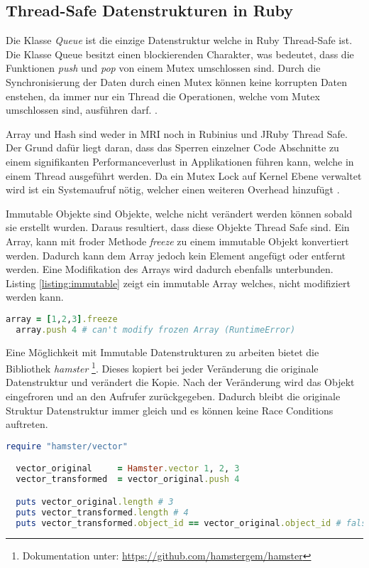 \subsection{Thread-Safe Datenstrukturen in Ruby}
Die Klasse \emph{Queue} ist die einzige Datenstruktur welche in Ruby Thread-Safe ist. Die Klasse Queue besitzt einen blockierenden Charakter, was bedeutet, dass die Funktionen \emph{push} und \emph{pop} von einem Mutex umschlossen sind. Durch die Synchronisierung der Daten durch einen Mutex können keine korrupten Daten enstehen, da immer nur ein Thread die Operationen, welche vom Mutex umschlossen sind, ausführen darf. \cite[p. 110]{Sto2013}. 

Array und Hash sind weder in MRI noch in Rubinius und JRuby Thread Safe. Der Grund dafür liegt daran, dass das Sperren einzelner Code Abschnitte zu einem signifikanten Performanceverlust in Applikationen führen kann, welche in einem Thread ausgeführt werden. Da ein Mutex Lock auf Kernel Ebene verwaltet wird ist ein Systemaufruf nötig, welcher einen weiteren Overhead hinzufügt \cite[p. 110]{Sto2013}.

Immutable Objekte sind Objekte, welche nicht verändert werden können sobald sie erstellt wurden. Daraus resultiert, dass diese Objekte Thread Safe sind. Ein Array, kann mit froder Methode \emph{freeze} zu einem immutable Objekt konvertiert werden. Dadurch kann dem Array jedoch kein Element angefügt oder entfernt werden. Eine Modifikation des Arrays wird dadurch ebenfalls unterbunden. Listing \ref{listing:immutable} zeigt ein immutable Array welches, nicht modifiziert werden kann. 

\begin{lstlisting}[language=Ruby,label={listing:immutable}]
  array = [1,2,3].freeze
  array.push 4 # can't modify frozen Array (RuntimeError)
\end{lstlisting}

Eine Möglichkeit mit Immutable Datenstrukturen zu arbeiten bietet die Bibliothek \emph{hamster} \footnote{Dokumentation unter: \url{https://github.com/hamstergem/hamster}}. Dieses kopiert bei jeder Veränderung die originale Datenstruktur und verändert die Kopie. Nach der Veränderung wird das Objekt eingefroren und an den Aufrufer zurückgegeben. Dadurch bleibt die originale Struktur Datenstruktur immer gleich und es können keine Race Conditions auftreten. 

\begin{lstlisting}[language=Ruby,label={listing:immuteable hamster}]
  require "hamster/vector"

  vector_original     = Hamster.vector 1, 2, 3
  vector_transformed  = vector_original.push 4

  puts vector_original.length # 3
  puts vector_transformed.length # 4
  puts vector_transformed.object_id == vector_original.object_id # false
\end{lstlisting}

